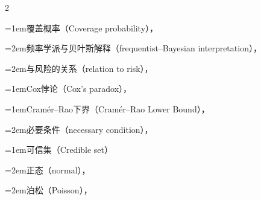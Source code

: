 \begin{multicols}{2}
\par\noindent\hangindent=1em\hspace*{0em}\label{idx:224}覆盖概率（Coverage probability），\hyperref[def:9.1.4]{\pageref*{def:9.1.4}}\par
\par\noindent\hangindent=2em\hspace*{1em}\label{idx:225}频率学派与贝叶斯解释（frequentist–Bayesian interpretation），\hyperref[idxocc:225:384]{\pageref*{idxocc:225:384}}\par
\par\noindent\hangindent=2em\hspace*{1em}\label{idx:226}与风险的关系（relation to risk），\hyperref[idxocc:226:395]{\pageref*{idxocc:226:395}}\par
\par\addvspace{2pt}
\par\noindent\hangindent=1em\hspace*{0em}\label{idx:227}Cox悖论（Cox’s paradox），\hyperref[exercise:9.49]{\pageref*{exercise:9.49}}\par
\par\addvspace{2pt}
\par\noindent\hangindent=1em\hspace*{0em}\label{idx:228}Cramér–Rao下界（Cramér–Rao Lower Bound），\hyperref[thm:7.3.9]{\pageref*{thm:7.3.9}}\par
\par\noindent\hangindent=2em\hspace*{1em}\label{idx:229}必要条件（necessary condition），\hyperref[cor:7.3.15]{\pageref*{cor:7.3.15}}\par
\par\addvspace{2pt}
\par\noindent\hangindent=1em\hspace*{0em}\label{idx:230}可信集（Credible set）\par
\par\noindent\hangindent=2em\hspace*{1em}\label{idx:231}正态（normal），\hyperref[ex:9.2.18]{\pageref*{ex:9.2.18}}\par
\par\noindent\hangindent=2em\hspace*{1em}\label{idx:232}泊松（Poisson），\hyperref[ex:9.2.16]{\pageref*{ex:9.2.16}}\par

\end{multicols}
